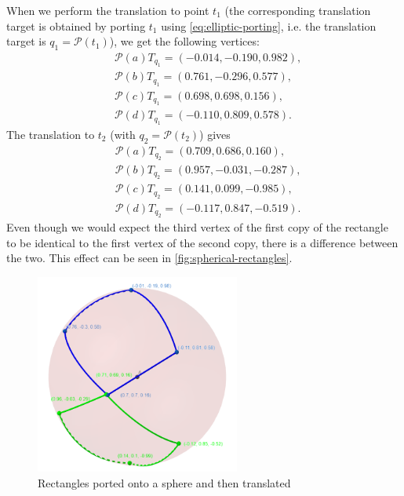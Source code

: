 When we perform the translation to point $t_1$ (the corresponding translation target is obtained by porting $t_1$ using \autoref{eq:elliptic-porting}, i.e. the translation target is $q_1 = \mathcal{P}(t_1)$), we get the following vertices:
\begin{equation*}
    \begin{split}
         & \mathcal{P}(a)T_{q_1} =  (-0.014, -0.190, 0.982), \\
         & \mathcal{P}(b)T_{q_1} = (0.761, -0.296, 0.577),   \\
         & \mathcal{P}(c)T_{q_1} = (0.698, 0.698, 0.156),    \\
         & \mathcal{P}(d)T_{q_1} = (-0.110, 0.809, 0.578).
    \end{split}
\end{equation*}
The translation to $t_2$ (with $q_2 = \mathcal{P}(t_2)$) gives
\begin{equation*}
    \begin{split}
         & \mathcal{P}(a)T_{q_2} = (0.709, 0.686, 0.160),   \\
         & \mathcal{P}(b)T_{q_2} = (0.957, -0.031, -0.287), \\
         & \mathcal{P}(c)T_{q_2} = (0.141, 0.099, -0.985),  \\
         & \mathcal{P}(d)T_{q_2} = (-0.117, 0.847, -0.519).
    \end{split}
\end{equation*}
Even though we would expect the third vertex of the first copy of the rectangle to be identical to the first vertex of the second copy, there is a difference between the two.
This effect can be seen in \autoref{fig:spherical-rectangles}.
\begin{figure}[h]
    \centering
    \includegraphics[width=0.6\textwidth]{chapters/theoretical_foundations/sections/non-eudlidean-spaces/resources/spherical-rectangles.png}
    \caption{Rectangles ported onto a sphere and then translated}
    \label{fig:spherical-rectangles}
\end{figure}
